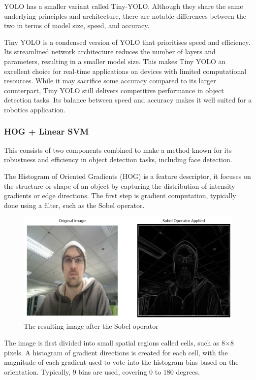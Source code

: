 YOLO has a smaller variant called Tiny-YOLO. Although they share the same underlying principles and architecture, there are notable differences between the two in terms of model size, speed, and accuracy.

Tiny YOLO is a condensed version of YOLO that prioritises speed and efficiency. Its streamlined network architecture reduces the number of layers and parameters, resulting in a smaller model size. This makes Tiny YOLO an excellent choice for real-time applications on devices with limited computational resources. While it may sacrifice some accuracy compared to its larger counterpart, Tiny YOLO still delivers competitive performance in object detection tasks. Its balance between speed and accuracy makes it well suited for a robotics application.

\subsubsection{HOG + Linear SVM}

This consists of two components combined to make a method known for its robustness and efficiency in object detection tasks, including face detection.

The Histogram of Oriented Gradients (HOG) is a feature descriptor, it focuses on the structure or shape of an object by capturing the distribution of intensity gradients or edge directions. The first step is gradient computation, typically done using a filter, such as the Sobel operator.

\begin{figure}[!htb]
    \centering{}
    \includegraphics[scale=0.35]{m+m_images/figure1_sobel_hog.png}
    \caption{The resulting image after the Sobel operator}
    \label{figure:hogsobel}
\end{figure}

The image is first divided into small spatial regions called cells, such as 8\(\times\)8 pixels. A histogram of gradient directions is created for each cell, with the magnitude of each gradient used to vote into the histogram bins based on the orientation. Typically, 9 bins are used, covering 0 to 180 degrees.

